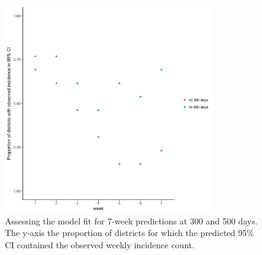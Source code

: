 \documentclass[11pt,]{article}
\begin{document}
  \begin{figure}
    \centering
    \includegraphics[width=0.8\textwidth]{ms6-figures/goodness_districts.png}
    \caption{Assessing the model fit for 7-week predictions at 300 and 500
      days. The y-axis the proportion of districts for which the predicted
      95\% CI contained the observed weekly incidence count.}
    \label{fig:gf}
  \end{figure}
\end{document}
